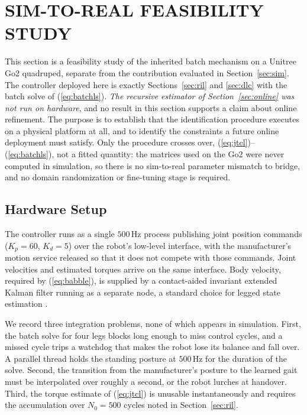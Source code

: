 \documentclass[a4paper, 10pt, conference]{ieeeconf}
\begin{document}
\section{SIM-TO-REAL FEASIBILITY STUDY}
\label{sec:sim2real}

This section is a feasibility study of the inherited batch mechanism on
a Unitree Go2 quadruped, separate from the contribution evaluated in
Section~\ref{sec:sim}. The controller deployed here is exactly
Sections~\ref{sec:ril} and \ref{sec:dlc} with the batch solve of
(\ref{eq:batchls}). \emph{The recursive estimator of Section~\ref{sec:online} was
not run on hardware}, and no result in this section supports a claim about online
refinement. The purpose is to establish that the identification procedure
executes on a physical platform at all, and to identify the constraints a future
online deployment must satisfy. Only the procedure crosses over,
(\ref{eq:jtcl})--(\ref{eq:batchls}), not a fitted quantity: the matrices used on
the Go2 were never computed in simulation, so there is no sim-to-real parameter
mismatch to bridge, and no domain randomization or fine-tuning stage is required.



\subsection{Hardware Setup}

The controller runs as a single $500$\,Hz process publishing joint position
commands ($K_p=60$, $K_d=5$) over the robot's low-level interface, with the
manufacturer's motion service released so that it does not compete with those
commands. Joint velocities and estimated torques arrive on the same interface.
Body velocity, required by
(\ref{eq:babble}), is supplied by a contact-aided
invariant extended Kalman filter \cite{hartley2020} running as a separate node, a
standard choice for legged state estimation \cite{yang2023}.

We record three integration problems, none of which appears in
simulation. First, the batch solve for four legs blocks long enough to miss
control cycles, and a missed cycle trips a watchdog that makes the robot lose its
balance and fall over.
A parallel thread holds the standing posture at $500$\,Hz for the duration
of the solve. Second, the transition from the manufacturer's posture to the
learned gait must be interpolated over roughly a second, or the robot lurches at
handover. Third, the torque estimate of (\ref{eq:jtcl}) is unusable
instantaneously and requires the accumulation over $N_0=500$ cycles noted in
Section~\ref{sec:ril}.
\end{document}
